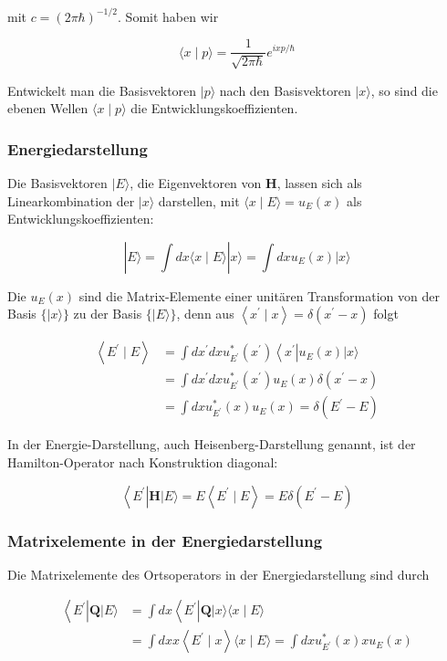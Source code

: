 \documentclass[10pt, letterpaper]{article}
\begin{document}
mit $c=(2 \pi \hbar)^{-1 / 2}$. Somit haben wir

$$
\langle x \mid p\rangle=\frac{1}{\sqrt{2 \pi \hbar}} e^{i x p / \hbar}
$$

Entwickelt man die Basisvektoren $|p\rangle$ nach den Basisvektoren $|x\rangle$, so sind die ebenen Wellen $\langle x \mid p\rangle$ die Entwicklungskoeffizienten.

\subsubsection*{Energiedarstellung}
Die Basisvektoren $|E\rangle$, die Eigenvektoren von $\mathbf{H}$, lassen sich als Linearkombination der $|x\rangle$ darstellen, mit $\langle x \mid E\rangle=u_{E}(x)$ als Entwicklungskoeffizienten:

$$
|E\rangle=\int d x\langle x \mid E\rangle|x\rangle=\int d x u_{E}(x)|x\rangle
$$

Die $u_{E}(x)$ sind die Matrix-Elemente einer unitären Transformation von der Basis $\{|x\rangle\}$ zu der Basis $\{|E\rangle\}$, denn aus $\left\langle x^{\prime} \mid x\right\rangle=\delta\left(x^{\prime}-x\right)$ folgt

$$
\begin{aligned}
\left\langle E^{\prime} \mid E\right\rangle & =\int d x^{\prime} d x u_{E^{\prime}}^{*}\left(x^{\prime}\right)\left\langle x^{\prime}\right| u_{E}(x)|x\rangle \\
& =\int d x^{\prime} d x u_{E^{\prime}}^{*}\left(x^{\prime}\right) u_{E}(x) \delta\left(x^{\prime}-x\right) \\
& =\int d x u_{E^{\prime}}^{*}(x) u_{E}(x)=\delta\left(E^{\prime}-E\right)
\end{aligned}
$$

In der Energie-Darstellung, auch Heisenberg-Darstellung genannt, ist der Hamilton-Operator nach Konstruktion diagonal:

$$
\left\langle E^{\prime}\right| \mathbf{H}|E\rangle=E\left\langle E^{\prime} \mid E\right\rangle=E \delta\left(E^{\prime}-E\right)
$$

\subsubsection*{Matrixelemente in der Energiedarstellung}
Die Matrixelemente des Ortsoperators in der Energiedarstellung sind durch

$$
\begin{aligned}
\left\langle E^{\prime}\right| \mathbf{Q}|E\rangle & =\int d x\left\langle E^{\prime}\right| \mathbf{Q}|x\rangle\langle x \mid E\rangle \\
& =\int d x x\left\langle E^{\prime} \mid x\right\rangle\langle x \mid E\rangle=\int d x u_{E^{\prime}}^{*}(x) x u_{E}(x)
\end{aligned}
$$
\end{document}
